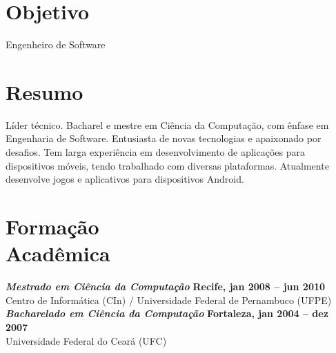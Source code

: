 \documentclass[margin, 10pt]{res} %
\begin{document}
\begin{resume}

 \vspace{-0.12in}
\section{Objetivo}  

Engenheiro de Software

 
\section{Resumo}  

Líder técnico. Bacharel e mestre em Ciência da Computação, com ênfase em Engenharia de Software. Entusiasta de novas tecnologias e apaixonado por desafios. Tem larga experiência em desenvolvimento de aplicações para dispositivos móveis, tendo trabalhado com diversas plataformas. Atualmente desenvolve jogos e aplicativos para dispositivos Android.


\section{Formação \\ Acadêmica}

{\sl\bf Mestrado em Ciência da Computação} \hfill {\bf Recife, jan 2008 -- jun 2010} \\
Centro de Informática (CIn) / Universidade Federal de Pernambuco (UFPE) %
\vspace{0.02in}
\\{\sl\bf Bacharelado em Ciência da Computação} \hfill {\bf Fortaleza, jan 2004 -- dez 2007} \\
Universidade Federal do Ceará (UFC)  
 

\end{resume}
\end{document}
